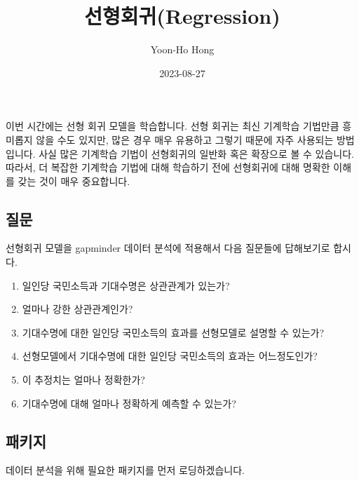 \documentclass[
  letterpaper,
  DIV=11,
  numbers=noendperiod]{scrartcl}
\title{선형회귀(Regression)}
\author{Yoon-Ho Hong}
\date{2023-08-27}
\providecommand{\tightlist}{%
  \setlength{\itemsep}{0pt}\setlength{\parskip}{0pt}}\usepackage{longtable,booktabs,array}
\renewcommand*\contentsname{Table of contents}
\newcommand\contentsname{Table of contents}
\begin{document}
\maketitle
\ifdefined\Shaded\renewenvironment{Shaded}{\begin{tcolorbox}[boxrule=0pt, borderline west={3pt}{0pt}{shadecolor}, sharp corners, enhanced, interior hidden, frame hidden, breakable]}{\end{tcolorbox}}\fi

\renewcommand*\contentsname{Table of contents}
{
\hypersetup{linkcolor=}
\setcounter{tocdepth}{3}
\tableofcontents
}
이번 시간에는 선형 회귀 모델을 학습합니다. 선형 회귀는 최신 기계학습
기법만큼 흥미롭지 않을 수도 있지만, 많은 경우 매우 유용하고 그렇기
때문에 자주 사용되는 방법입니다. 사실 많은 기계학습 기법이 선형회귀의
일반화 혹은 확장으로 볼 수 있습니다. 따라서, 더 복잡한 기계학습 기법에
대해 학습하기 전에 선형회귀에 대해 명확한 이해를 갖는 것이 매우
중요합니다.

\hypertarget{uxc9c8uxbb38}{%
\subsection{질문}\label{uxc9c8uxbb38}}

선형회귀 모델을 gapminder 데이터 분석에 적용해서 다음 질문들에
답해보기로 합시다.

\begin{enumerate}
\def\labelenumi{\arabic{enumi}.}
\tightlist
\item
  일인당 국민소득과 기대수명은 상관관계가 있는가?
\item
  얼마나 강한 상관관계인가?\\
\item
  기대수명에 대한 일인당 국민소득의 효과를 선형모델로 설명할 수 있는가?
\item
  선형모델에서 기대수명에 대한 일인당 국민소득의 효과는 어느정도인가?\\
\item
  이 추정치는 얼마나 정확한가?\\
\item
  기대수명에 대해 얼마나 정확하게 예측할 수 있는가?
\end{enumerate}

\hypertarget{uxd328uxd0a4uxc9c0}{%
\subsection{패키지}\label{uxd328uxd0a4uxc9c0}}

데이터 분석을 위해 필요한 패키지를 먼저 로딩하겠습니다.
\end{document}
